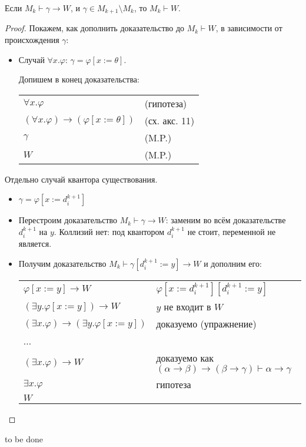 \begin{lemma}
    Если $M_k\vdash\gamma\to W$, и $\gamma\in M_{k+1}\setminus M_k$, то $M_k\vdash W$.
\end{lemma}

\begin{proof}
Покажем, как дополнить доказательство до $M_k\vdash W$, в зависимости от происхождения $\gamma$:


\begin{itemize}
\item Случай $\forall x.\varphi$: $\gamma = \varphi[x:=\theta]$.

Допишем в конец доказательства:

\begin{tabular}{ll}
$\forall x.\varphi$ & (гипотеза)\\
$(\forall x.\varphi)\to(\varphi[x:=\theta])$ & (сх. акс. 11)\\
$\gamma$  & (M.P.) \\
$W$ & (M.P.)
\end{tabular}
\end{itemize}

Отдельно случай квантора существования.

\begin{itemize}\item $\gamma = \varphi[x := d^{k+1}_i]$


    \item Перестроим доказательство $M_k\vdash \gamma\to W$:
    заменим во всём доказательстве $d^{k+1}_i$ на $y$.
    Коллизий нет: под квантором $d^{k+1}_i$ не стоит, переменной не является.
    \item Получим доказательство $M_k\vdash \gamma[d^{k+1}_i := y]\to W$ и дополним его:

    \begin{tabular}{ll}
    $\varphi[x := y]\to W$ & $\varphi[x := d^{k+1}_i][d^{k+1}_i := y]$\\
    $(\exists y.\varphi[x:=y])\to W$ & $y$ не входит в $W$ \\
    $(\exists x.\varphi)\to(\exists y.\varphi[x:=y])$ & доказуемо (упражнение)\\
     ... \\
    $(\exists x.\varphi)\to W$ & доказуемо как $(\alpha\to\beta)\to(\beta\to\gamma)\vdash\alpha\to\gamma$ \\
    $\exists x.\varphi$ & гипотеза\\
    $W$
    \end{tabular}
\end{itemize}
\end{proof}

to be done
